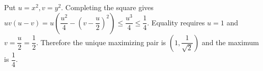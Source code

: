 Put $u=x^2,v=y^2$. Completing the square gives $uv(u-v)=u\left(\dfrac{u^2}{4}-(v-\dfrac{u}{2})^2\right)\le\dfrac{u^3}{4}\le\dfrac{1}{4}$. Equality requires $u=1$ and $v=\dfrac{u}{2}=\dfrac{1}{2}$. Therefore the unique maximizing pair is $\boxed{(1,\dfrac{1}{\sqrt2})}$ and the maximum is $\boxed{\dfrac{1}{4}}$.
